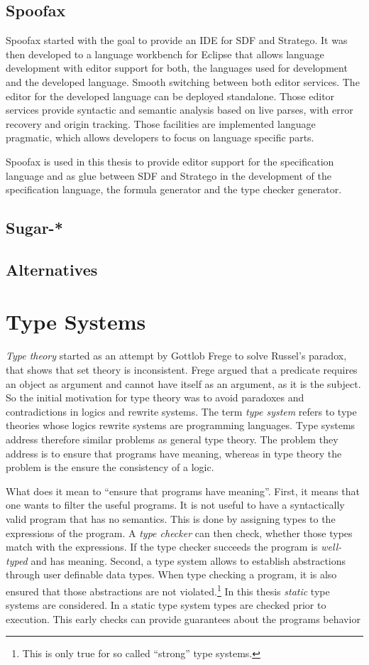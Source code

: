 \documentclass[a4paper,twoside]{report}
\begin{document}
\subsection{Spoofax}
Spoofax started with the goal to provide an IDE for SDF and
Stratego. It was then developed to a language workbench for Eclipse
that allows language development with editor support for both, the
languages used for development and the developed language. Smooth
switching between both editor services. The editor for the developed
language can be deployed standalone. Those editor services provide
syntactic and semantic analysis based on live parses, with error
recovery and origin tracking. Those facilities are implemented
language pragmatic, which allows developers to focus on language
specific parts.

Spoofax is used in this thesis to provide editor support for the
specification language and as glue between SDF and Stratego in the
development of the specification language, the formula generator and
the type checker generator.
\subsection{Sugar-*}
\subsection{Alternatives}
\section{Type Systems}
\textit{Type theory} started as an attempt by Gottlob Frege to solve Russel's
paradox, that shows that \naive set theory is inconsistent. Frege
argued that a predicate requires an object as argument and cannot have
itself as an argument, as it is the subject. So the initial motivation for type theory was to avoid
paradoxes and contradictions in logics and rewrite systems. The term
\textit{type system} refers to type theories whose logics rewrite
systems are programming languages. Type systems address therefore
similar problems as general type theory. The problem they address is
to ensure that programs have meaning, whereas in type theory the
problem is the ensure the consistency of a logic.

What does it mean to ``ensure that programs have meaning''. First, it
means that one wants to filter the useful programs. It is not useful
to have a syntactically valid program that has no semantics. This is
done by assigning types to the expressions of the program. A
\textit{type checker} can then check, whether those types match with
the expressions. If the type checker succeeds the program is
\textit{well-typed} and has meaning. Second, a type system allows to
establish abstractions through user definable data types. When type
checking a program, it is also ensured that those abstractions are not
violated.\footnote{This is only true for so called ``strong'' type
  systems.} In this thesis \textit{static} type systems are
considered. In a static type system types are checked prior to
execution. This early checks can provide guarantees about the programs
behavior 
\end{document}

